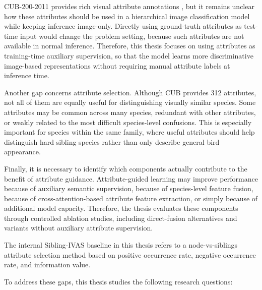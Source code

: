 CUB-200-2011 provides rich visual attribute annotations \cite{wah2011cub}, but it remains unclear how these attributes should be used in a hierarchical image classification model while keeping inference image-only. Directly using ground-truth attributes as test-time input would change the problem setting, because such attributes are not available in normal inference. Therefore, this thesis focuses on using attributes as training-time auxiliary supervision, so that the model learns more discriminative image-based representations without requiring manual attribute labels at inference time.

Another gap concerns attribute selection. Although CUB provides 312 attributes, not all of them are equally useful for distinguishing visually similar species. Some attributes may be common across many species, redundant with other attributes, or weakly related to the most difficult species-level confusions. This is especially important for species within the same family, where useful attributes should help distinguish hard sibling species rather than only describe general bird appearance.

Finally, it is necessary to identify which components actually contribute to the benefit of attribute guidance. Attribute-guided learning may improve performance because of auxiliary semantic supervision, because of species-level feature fusion, because of cross-attention-based attribute feature extraction, or simply because of additional model capacity. Therefore, the thesis evaluates these components through controlled ablation studies, including direct-fusion alternatives and variants without auxiliary attribute supervision.

The internal Sibling-IVAS baseline in this thesis refers to a node-vs-siblings attribute selection method based on positive occurrence rate, negative occurrence rate, and information value.

To address these gaps, this thesis studies the following research questions:

